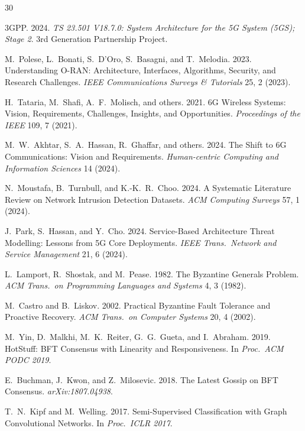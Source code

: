 \documentclass[sigconf,nonacm]{acmart}
\begin{document}
\sloppy

\begin{thebibliography}{30}

3GPP. 2024. \textit{TS 23.501 V18.7.0: System Architecture for the
5G System (5GS); Stage 2}. 3rd Generation Partnership Project.

M.~Polese, L.~Bonati, S.~D'Oro, S.~Basagni, and T.~Melodia. 2023.
Understanding O-RAN: Architecture, Interfaces, Algorithms,
Security, and Research Challenges. \textit{IEEE Communications
Surveys \& Tutorials} 25, 2 (2023).

H.~Tataria, M.~Shafi, A.~F.~Molisch, and others. 2021. 6G Wireless
Systems: Vision, Requirements, Challenges, Insights, and
Opportunities. \textit{Proceedings of the IEEE} 109, 7 (2021).

M.~W.~Akhtar, S.~A.~Hassan, R.~Ghaffar, and others. 2024. The
Shift to 6G Communications: Vision and Requirements.
\textit{Human-centric Computing and Information Sciences} 14
(2024).

N.~Moustafa, B.~Turnbull, and K.-K.~R.~Choo. 2024. A Systematic
Literature Review on Network Intrusion Detection Datasets.
\textit{ACM Computing Surveys} 57, 1 (2024).

J.~Park, S.~Hassan, and Y.~Cho. 2024. Service-Based Architecture
Threat Modelling: Lessons from 5G Core Deployments.
\textit{IEEE Trans.\ Network and Service Management} 21, 6 (2024).

L.~Lamport, R.~Shostak, and M.~Pease. 1982. The Byzantine Generals
Problem. \textit{ACM Trans.\ on Programming Languages and Systems}
4, 3 (1982).

M.~Castro and B.~Liskov. 2002. Practical Byzantine Fault Tolerance
and Proactive Recovery. \textit{ACM Trans.\ on Computer Systems}
20, 4 (2002).

M.~Yin, D.~Malkhi, M.~K.~Reiter, G.~G.~Gueta, and I.~Abraham. 2019.
HotStuff: BFT Consensus with Linearity and Responsiveness.
In \textit{Proc.\ ACM PODC 2019}.

E.~Buchman, J.~Kwon, and Z.~Milosevic. 2018. The Latest Gossip on
BFT Consensus. \textit{arXiv:1807.04938}.

T.~N.~Kipf and M.~Welling. 2017. Semi-Supervised Classification
with Graph Convolutional Networks. In \textit{Proc.\ ICLR 2017}.


\end{thebibliography}
\end{document}
